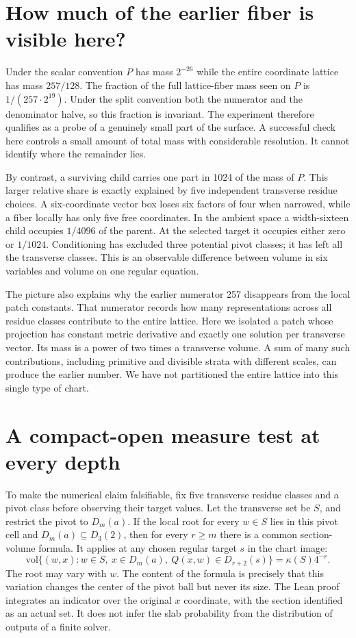 \documentclass[12pt,letterpaper]{article}
\begin{document}
\section{How much of the earlier fiber is visible here?}
Under the scalar convention $P$ has mass $2^{-26}$ while the entire coordinate lattice has mass $257/128$. The fraction of the full lattice-fiber mass seen on $P$ is $1/(257\cdot2^{19})$. Under the split convention both the numerator and the denominator halve, so this fraction is invariant. The experiment therefore qualifies as a probe of a genuinely small part of the surface. A successful check here controls a small amount of total mass with considerable resolution. It cannot identify where the remainder lies.

By contrast, a surviving child carries one part in 1024 of the mass of $P$. This larger relative share is exactly explained by five independent transverse residue choices. A six-coordinate vector box loses six factors of four when narrowed, while a fiber locally has only five free coordinates. In the ambient space a width-sixteen child occupies $1/4096$ of the parent. At the selected target it occupies either zero or $1/1024$. Conditioning has excluded three potential pivot classes; it has left all the transverse classes. This is an observable difference between volume in six variables and volume on one regular equation.

The picture also explains why the earlier numerator 257 disappears from the local patch constants. That numerator records how many representations across all residue classes contribute to the entire lattice. Here we isolated a patch whose projection has constant metric derivative and exactly one solution per transverse vector. Its mass is a power of two times a transverse volume. A sum of many such contributions, including primitive and divisible strata with different scales, can produce the earlier number. We have not partitioned the entire lattice into this single type of chart.
\section{A compact-open measure test at every depth}
To make the numerical claim falsifiable, fix five transverse residue classes and a pivot class before observing their target values. Let the transverse set be $S$, and restrict the pivot to $D_m(a)$. If the local root for every $w\in S$ lies in this pivot cell and $D_m(a)\subseteq D_3(2)$, then for every $r\ge m$ there is a common section-volume formula. It applies at any chosen regular target $s$ in the chart image:
\[
 \mathrm{vol}\{(w,x):w\in S,\ x\in D_m(a),\ Q(x,w)\in D_{r+2}(s)\}
        =\kappa(S)4^{-r}.
\]
The root may vary with $w$. The content of the formula is precisely that this variation changes the center of the pivot ball but never its size. The Lean proof integrates an indicator over the original $x$ coordinate, with the section identified as an actual set. It does not infer the slab probability from the distribution of outputs of a finite solver.
\end{document}
